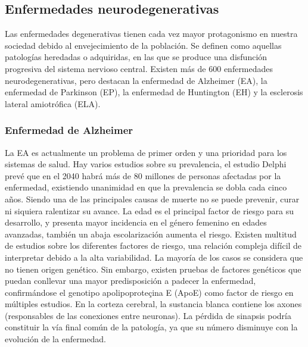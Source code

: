 \documentclass[12pt]{article}
\begin{document}
	\subsection{Enfermedades neurodegenerativas}
	
	Las enfermedades degenerativas tienen cada vez mayor protagonismo en nuestra sociedad debido al envejecimiento de la población. Se definen como aquellas patologías heredadas o adquiridas, en las que se produce una disfunción progresiva del sistema nervioso central. Existen más de 600 enfermedades neurodegenerativas, pero destacan la enfermedad de Alzheimer (EA), la enfermedad de Parkinson (EP), la enfermedad de Huntington (EH) y la esclerosis lateral amiotrófica (ELA).
	
		\subsubsection{Enfermedad de Alzheimer}
		
		La EA es actualmente un problema de primer orden y una prioridad para los sistemas de salud. Hay varios estudios sobre su prevalencia, el estudio Delphi prevé que en el 2040 habrá más de 80 millones de personas afectadas por la enfermedad, existiendo unanimidad en que la prevalencia se dobla cada cinco años. Siendo una de las principales causas de muerte no se puede prevenir, curar ni siquiera ralentizar su avance.
		La edad es el principal factor de riesgo para su desarrollo, y presenta mayor incidencia en el género femenino en edades avanzadas, también un abaja escolarización aumenta el riesgo. Existen multitud de estudios sobre los diferentes factores de riesgo, una relación compleja difícil de interpretar debido a la alta variabilidad. La mayoría de los casos se considera que no tienen origen genético. Sin embargo, existen pruebas de factores genéticos que puedan conllevar una mayor predisposición a padecer la enfermedad, confirmándose el genotipo apolipoproteçina E (ApoE) como factor de riesgo en múltiples estudios.
		En la corteza cerebral, la sustancia blanca contiene los axones (responsables de las conexiones entre neuronas). La pérdida de sinapsis podría constituir la vía final común de la patología, ya que su número disminuye con la evolución de la enfermedad.\\
		
\end{document}
